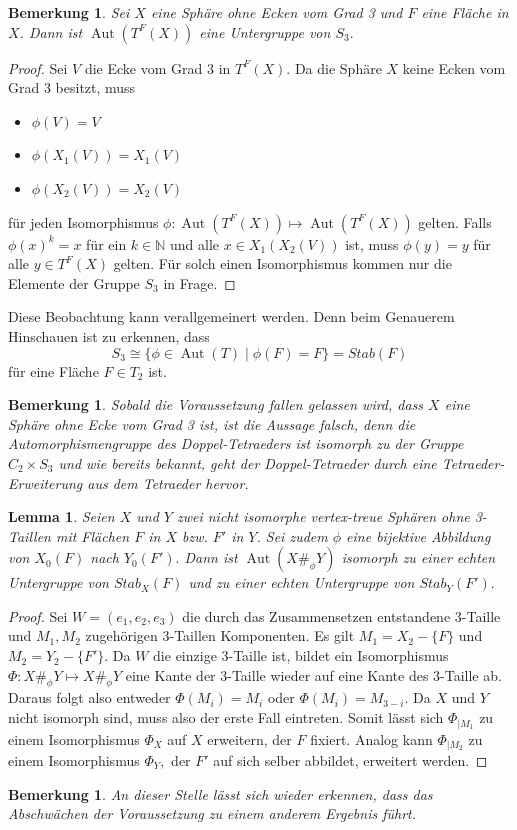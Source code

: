 \documentclass[12pt,titlepage,twoside,cleardoublepage]{article}
\theoremstyle{nummermitklammern}
\newtheorem{lemma}[temp]{Lemma}
\newtheorem{bemerkung}[temp]{Bemerkung}
\newtheorem{lemma}[zahl]{Lemma}
\newtheorem{bemerkung}[zahl]{Bemerkung}
\numberwithin{equation}{section}
\DeclareMathOperator{\Aut}{Aut}
\begin{document}
\begin{bemerkung}
Sei $X$ eine Sphäre ohne Ecken vom Grad 3 und $F$ eine Fläche in $X$. Dann ist $\Aut(T^F(X))$ eine Untergruppe von $S_3.$ 
\end{bemerkung}
\begin{proof}
Sei $V$ die Ecke vom Grad 3 in $T^F(X).$
Da die Sphäre $X$ keine Ecken vom Grad 3 besitzt, muss
\begin{itemize}
\item $\phi(V)=V$
\item $\phi (X_1(V))=X_1(V)$
\item $\phi (X_2(V))=X_2(V)$
\end{itemize}
für jeden Isomorphismus $\phi:\Aut({T}^F(X))\mapsto \Aut({T}^F(X))$ gelten. Falls $\phi(x)^k=x$ für ein $k \in \mathbb{N}$ und alle $x \in X_1(X_2(V))$ ist, muss $\phi(y)=y$ für alle $y\in T^F(X)$ gelten. Für solch einen Isomorphismus kommen nur die Elemente der Gruppe $S_3$ in Frage. 
\end{proof}
Diese Beobachtung kann verallgemeinert werden. Denn beim Genauerem Hinschauen ist zu erkennen, dass 
\[
S_3\cong\{\phi\in \Aut(T)\mid \phi(F)=F\}=Stab(F)
\] für eine Fläche $F\in T_2$ ist.
\begin{bemerkung}
Sobald die Voraussetzung fallen gelassen wird, dass $X$ eine Sphäre ohne Ecke vom Grad 3 ist, ist die Aussage falsch, denn die Automorphismengruppe des Doppel-Tetraeders ist isomorph zu der Gruppe $C_2\times S_3$ und wie bereits bekannt, geht der Doppel-Tetraeder durch eine Tetraeder-Erweiterung aus dem  Tetraeder hervor.
\end{bemerkung}
\begin{lemma}
Seien $X$ und $Y$ zwei nicht isomorphe vertex-treue Sphären ohne 3-Taillen mit Flächen $F$ in $X$ bzw. $F'$ in $Y$. Sei zudem $\phi$ eine bijektive Abbildung von $X_0(F)$ nach $Y_0(F').$ Dann ist $\Aut(X\#_\phi Y)$ isomorph zu einer echten Untergruppe von $Stab_X(F)$ und zu einer echten Untergruppe von $Stab_Y(F').$
\end{lemma}
\begin{proof}
Sei $W=(e_1,e_2,e_3)$ die durch das Zusammensetzen entstandene 3-Taille und $M_1,M_2$ zugehörigen 3-Taillen Komponenten. Es gilt $M_1=X_2-\{F\}$ und $M_2=Y_2-\{F'\}.$ Da $W$ die einzige 3-Taille ist, bildet ein Isomorphismus $\Phi:X\#_{\phi}Y \mapsto X\#_{\phi}Y$  eine Kante der 3-Taille wieder auf eine Kante des 3-Taille ab. Daraus folgt also entweder $\Phi(M_i)=M_i$ oder $\Phi(M_i)=M_{3-i}.$ Da $X$ und $Y$ nicht isomorph sind, muss also der erste Fall eintreten. Somit lässt sich \textsc{$\Phi_{\mid M_1}$} zu einem Isomorphismus $\Phi_X$ auf $X$ erweitern, der $F$ fixiert. Analog kann $\Phi_{\mid M_2}$ zu einem Isomorphismus $\Phi_Y,$ der $F'$ auf sich selber abbildet, erweitert werden.
\end{proof}
\begin{bemerkung}
An dieser Stelle lässt sich wieder erkennen, dass das Abschwächen
der Voraussetzung zu einem anderem Ergebnis führt.
\end{bemerkung}
\end{document}
